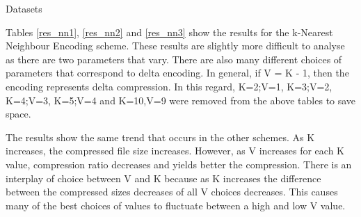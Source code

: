 \documentclass[a4paper,11pt]{report}
\begin{document}
\begin{section}{Datasets}
\begin{table}
\begin{center}
\end{center}
\caption{Compression information for \textbf{k-Nearest Neighbour Encoding} using K = 10 as our window size. The format is the same as in Table \ref{intres}.}
\label{res_nn3}
\end{table}

Tables \ref{res_nn1}, \ref{res_nn2} and \ref{res_nn3} show the results for the k-Nearest Neighbour Encoding scheme. These results are slightly more difficult to analyse as there are two parameters that vary. There are also many different choices of parameters that correspond to delta encoding. In general, if V = K - 1, then the encoding represents delta compression. In this regard, K=2;V=1, K=3;V=2, K=4;V=3, K=5;V=4 and K=10,V=9 were removed from the above tables to save space. 

The results show the same trend that occurs in the other schemes. As K increases, the compressed file size increases. However, as V increases for each K value, compression ratio decreases and yields better the compression. There is an interplay of choice between V and K because as K increases the difference between the compressed sizes decreases of all V choices decreases. This causes many of the best choices of values to fluctuate between a high and low V value.


\end{section}
\end{document}

